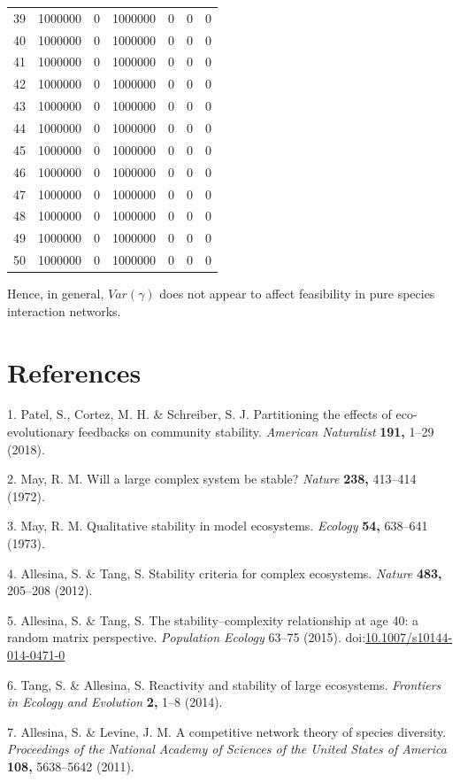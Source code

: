 \documentclass[]{article}
\begin{document}
\begin{longtable}[]{@{}rrrrrrr@{}}
39 & 1000000 & 0 & 1000000 & 0 & 0 & 0\tabularnewline
40 & 1000000 & 0 & 1000000 & 0 & 0 & 0\tabularnewline
41 & 1000000 & 0 & 1000000 & 0 & 0 & 0\tabularnewline
42 & 1000000 & 0 & 1000000 & 0 & 0 & 0\tabularnewline
43 & 1000000 & 0 & 1000000 & 0 & 0 & 0\tabularnewline
44 & 1000000 & 0 & 1000000 & 0 & 0 & 0\tabularnewline
45 & 1000000 & 0 & 1000000 & 0 & 0 & 0\tabularnewline
46 & 1000000 & 0 & 1000000 & 0 & 0 & 0\tabularnewline
47 & 1000000 & 0 & 1000000 & 0 & 0 & 0\tabularnewline
48 & 1000000 & 0 & 1000000 & 0 & 0 & 0\tabularnewline
49 & 1000000 & 0 & 1000000 & 0 & 0 & 0\tabularnewline
50 & 1000000 & 0 & 1000000 & 0 & 0 & 0\tabularnewline
\bottomrule
\end{longtable}

Hence, in general, \(Var(\gamma)\) does not appear to affect feasibility
in pure species interaction networks.

\section*{References}\label{references}

\hypertarget{refs}{}
\hypertarget{ref-Patel2018}{}
1. Patel, S., Cortez, M. H. \& Schreiber, S. J. Partitioning the effects
of eco-evolutionary feedbacks on community stability. \emph{American
Naturalist} \textbf{191,} 1--29 (2018).

\hypertarget{ref-May1972}{}
2. May, R. M. Will a large complex system be stable? \emph{Nature}
\textbf{238,} 413--414 (1972).

\hypertarget{ref-May1973}{}
3. May, R. M. Qualitative stability in model ecosystems. \emph{Ecology}
\textbf{54,} 638--641 (1973).

\hypertarget{ref-Allesina2012}{}
4. Allesina, S. \& Tang, S. Stability criteria for complex ecosystems.
\emph{Nature} \textbf{483,} 205--208 (2012).

\hypertarget{ref-Allesina2015a}{}
5. Allesina, S. \& Tang, S. The stability--complexity relationship at
age 40: a random matrix perspective. \emph{Population Ecology} 63--75
(2015).
doi:\href{https://doi.org/10.1007/s10144-014-0471-0}{10.1007/s10144-014-0471-0}

\hypertarget{ref-Tang2014b}{}
6. Tang, S. \& Allesina, S. Reactivity and stability of large
ecosystems. \emph{Frontiers in Ecology and Evolution} \textbf{2,} 1--8
(2014).

\hypertarget{ref-Allesina2011}{}
7. Allesina, S. \& Levine, J. M. A competitive network theory of species
diversity. \emph{Proceedings of the National Academy of Sciences of the
United States of America} \textbf{108,} 5638--5642 (2011).
\end{document}
